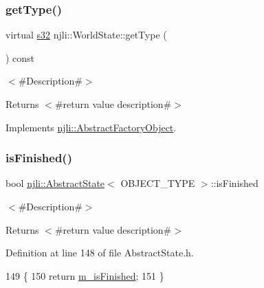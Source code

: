 \subsubsection{\texorpdfstring{get\+Type()}{getType()}}
{\footnotesize\ttfamily virtual \mbox{\hyperlink{_util_8h_aa62c75d314a0d1f37f79c4b73b2292e2}{s32}} njli\+::\+World\+State\+::get\+Type (\begin{DoxyParamCaption}{ }\end{DoxyParamCaption}) const\hspace{0.3cm}{\ttfamily [virtual]}}

$<$\#\+Description\#$>$

\begin{DoxyReturn}{Returns}
$<$\#return value description\#$>$ 
\end{DoxyReturn}


Implements \mbox{\hyperlink{classnjli_1_1_abstract_factory_object_a207c86146d40d0794708ae7f2d4e60a7}{njli\+::\+Abstract\+Factory\+Object}}.

\mbox{\label{classnjli_1_1_world_state_a4c7007210237496fbe169ba114c3750d}} 
\subsubsection{\texorpdfstring{is\+Finished()}{isFinished()}}
{\footnotesize\ttfamily bool \mbox{\hyperlink{classnjli_1_1_abstract_state}{njli\+::\+Abstract\+State}}$<$ O\+B\+J\+E\+C\+T\+\_\+\+T\+Y\+PE $>$\+::is\+Finished}

$<$\#\+Description\#$>$

\begin{DoxyReturn}{Returns}
$<$\#return value description\#$>$ 
\end{DoxyReturn}


Definition at line 148 of file Abstract\+State.\+h.


\begin{DoxyCode}
149   \{
150     \textcolor{keywordflow}{return} \mbox{\hyperlink{classnjli_1_1_abstract_state_a445a5d1ac7572b8b01b81937c89e960c}{m\_isFinished}};
151   \}
\end{DoxyCode}
\mbox{\label{classnjli_1_1_world_state_a92e70a36e927a44a8eefc6039505ed24}} 
